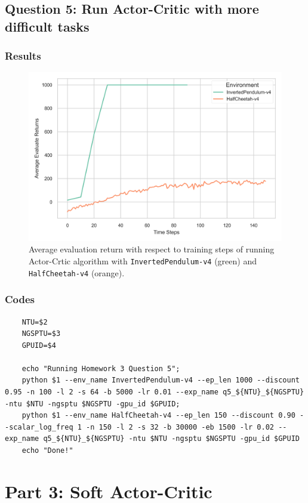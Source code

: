 \documentclass[10pt, letterpaper]{article}
\begin{document}
\pagebreak
\subsection*{Question 5: Run Actor-Critic with more difficult tasks}
\subsubsection*{Results}

\begin{figure}[thbp]
    \centering
    \includegraphics[width=\textwidth]{img/q5.png}
    \caption{Average evaluation return with respect to training steps of running Actor-Crtic algorithm with \texttt{InvertedPendulum-v4} (green) and \texttt{HalfCheetah-v4} (orange).}
    \label{fig:5}
\end{figure}
\subsubsection*{Codes}
\begin{lstlisting}
    NTU=$2
    NGSPTU=$3
    GPUID=$4

    echo "Running Homework 3 Question 5";
    python $1 --env_name InvertedPendulum-v4 --ep_len 1000 --discount 0.95 -n 100 -l 2 -s 64 -b 5000 -lr 0.01 --exp_name q5_${NTU}_${NGSPTU} -ntu $NTU -ngsptu $NGSPTU -gpu_id $GPUID;
    python $1 --env_name HalfCheetah-v4 --ep_len 150 --discount 0.90 --scalar_log_freq 1 -n 150 -l 2 -s 32 -b 30000 -eb 1500 -lr 0.02 --exp_name q5_${NTU}_${NGSPTU} -ntu $NTU -ngsptu $NGSPTU -gpu_id $GPUID
    echo "Done!"
\end{lstlisting}

\newpage
\section{Part 3: Soft Actor-Critic}
\end{document}
